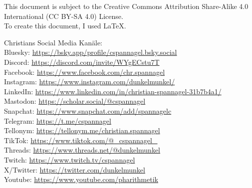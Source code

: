 \documentclass[12pt,a4paper,oneside,ngerman]{article}
\begin{document}
\tiny{This document is subject to the Creative Commons Attribution Share-Alike 4.0 International (CC BY-SA 4.0) License.
\\ To create this document, I used \LaTeX{}.

Christians Social Media Kanäle:\\
Bluesky: \url{https://bsky.app/profile/cspannagel.bsky.social}\\
Discord: \url{https://discord.com/invite/WYgECstu7T}\\
Facebook: \url{https://www.facebook.com/chr.spannagel}\\
Instagram: \url{https://www.instagram.com/dunkelmunkel/}\\
LinkedIn: \url{https://www.linkedin.com/in/christian-spannagel-31b7b4a1/}\\
Mastodon: \url{https://scholar.social/@cspannagel}\\
Snapchat: \url{https://www.snapchat.com/add/spannagelc}\\
Telegram: \url{https://t.me/cspannagel}\\
Tellonym: \url{https://tellonym.me/christian.spannagel}\\
TikTok: \url{https://www.tiktok.com/@_cspannagel_}\\
Threads: \url{https://www.threads.net/@dunkelmunkel}\\
Twitch: \url{https://www.twitch.tv/cspannagel}\\
X/Twitter: \url{https://twitter.com/dunkelmunkel}\\
Youtube: \url{https://www.youtube.com/pharithmetik}}\\


\end{document}
